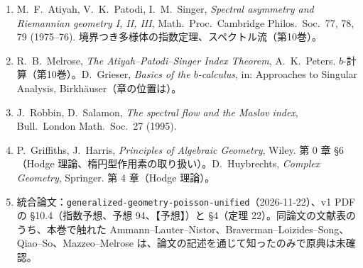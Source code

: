 \begin{enumerate}
\item M.~F.~Atiyah, V.~K.~Patodi, I.~M.~Singer, \emph{Spectral asymmetry and Riemannian geometry I, II, III}, Math.\ Proc.\ Cambridge Philos.\ Soc.\ 77, 78, 79 (1975--76). 境界つき多様体の指数定理、スペクトル流（第10巻）。
\item R.~B.~Melrose, \emph{The Atiyah--Patodi--Singer Index Theorem}, A.~K.~Peters. $b$-計算（第10巻）。D.~Grieser, \emph{Basics of the $b$-calculus}, in: Approaches to Singular Analysis, Birkhäuser（章の位置は\tQ）。
\item J.~Robbin, D.~Salamon, \emph{The spectral flow and the Maslov index}, Bull.\ London Math.\ Soc.\ 27 (1995).
\item P.~Griffiths, J.~Harris, \emph{Principles of Algebraic Geometry}, Wiley. 第 0 章 \S6（Hodge 理論、楕円型作用素の取り扱い）。D.~Huybrechts, \emph{Complex Geometry}, Springer. 第 4 章（Hodge 理論）。
\item 統合論文：\texttt{generalized-geometry-poisson-unified}（2026-11-22）、v1 PDF の §10.4（指数予想、予想 94、【予想】）と §4（定理 22）。同論文の文献表のうち、本巻で触れた Ammann--Lauter--Nistor、Braverman--Loizides--Song、Qiao--So、Mazzeo--Melrose は、論文の記述を通じて知ったのみで原典は未確認\tQ。
\end{enumerate}

